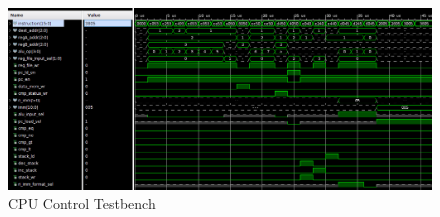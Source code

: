 \documentclass{article}
\begin{document}
\begin{par}
	\begin{figure}[H]
		\centering
		\includegraphics[width=7in]{img/CtrlUnitTB.png}
		\caption{CPU Control Testbench}
		\label{fig:cpuCtrlTB}
	\end{figure}
	
\end{par}

\newpage
\end{document}
